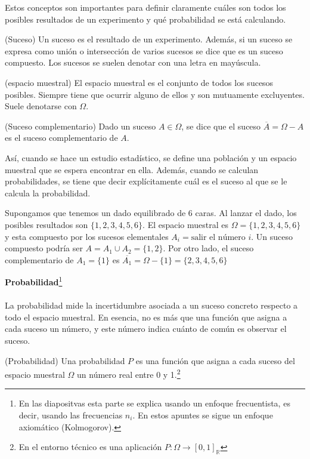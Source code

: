 Estos conceptos son importantes para definir claramente cuáles son todos los posibles resultados de un experimento y qué probabilidad se está calculando.
\begin{definition}(Suceso)
	Un suceso es el resultado de un experimento. Además, si un suceso se expresa como unión o intersección de varios sucesos se dice que es un suceso compuesto. Los sucesos se suelen denotar con una letra en mayúscula.
	\label{def:suceso_el}
\end{definition}
\begin{definition}(espacio muestral)
	El espacio muestral es el conjunto de todos los sucesos posibles. Siempre tiene que ocurrir alguno de ellos y son mutuamente excluyentes. Suele denotarse con $\Omega$.
	\label{def:espacio_sucesos}
\end{definition}
\begin{definition}(Suceso complementario)
	Dado un suceso $A \in \Omega$, se dice que el suceso $\overline{A} = \Omega - A$ es el suceso complementario de $A$.
	\label{def: suceso complementario}
\end{definition}
Así, cuando se hace un estudio estadístico, se define una población y un espacio muestral que se espera encontrar en ella. Además, cuando se calculan probabilidades, se tiene que decir explícitamente cuál es el suceso al que se le calcula la probabilidad.
\begin{example}
Supongamos que tenemos un dado equilibrado de 6 caras. Al lanzar el dado, los posibles resultados son $\lbrace 1,2,3,4,5,6\rbrace$. El espacio muestral es $\Omega = \lbrace 1,2,3,4,5,6\rbrace$ y esta compuesto por los sucesos elementales $A_i = \textrm{salir el número } i$. Un suceso compuesto podría ser $A = A_1 \cup A_2 = \lbrace 1,2\rbrace$. Por otro lado, el suceso complementario de $A_1 = \lbrace 1\rbrace$ es $\overline{A_1} = \Omega - \lbrace 1\rbrace = \lbrace 2,3,4,5,6\rbrace$\label{ex: espacio_sucesos}
\end{example}
\textbf{Probabilidad}\footnote{En las diapositvas esta parte se explica usando un enfoque frecuentista, es decir, usando las frecuencias $n_i$. En estos apuntes se sigue un enfoque axiomático (Kolmogorov).}\\\\
La probabilidad mide la incertidumbre asociada a un suceso concreto respecto a todo el espacio muestral. En esencia, no es más que una función que asigna a cada suceso un número, y este número indica cuánto de común es observar el suceso.
\begin{definition}(Probabilidad)
Una probabilidad $P$ es una función que asigna a cada suceso del espacio muestral $\Omega$ un número real entre 0 y 1.\footnote{ En el entorno técnico es una aplicación $P: \Omega \longrightarrow [0, 1]_{\mathbb{R}}$}
\end{definition}
